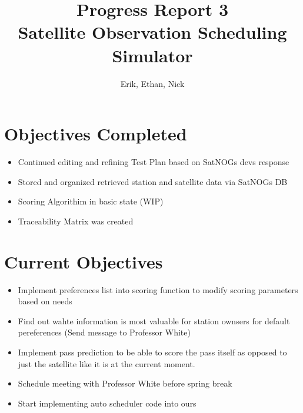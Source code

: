 \documentclass{article}
\title{Progress Report 3\\ Satellite Observation Scheduling Simulator}
\author{Erik, Ethan, Nick}
\begin{document}
\maketitle

\section{Objectives Completed}

\begin{itemize}
	\item Continued editing and refining Test Plan based on SatNOGs devs response
	\item Stored and organized retrieved station and satellite data via SatNOGs DB
  \item Scoring Algorithim in basic state (WIP)
  \item Traceability Matrix was created
\end{itemize}

\section{Current Objectives}

\begin{itemize}
  \item Implement preferences list into scoring function to modify scoring parameters based on needs
  \item Find out wahte information is most valuable for station ownsers for default pereferences (Send message to Professor White)
  \item Implement pass prediction to be able to score the pass itself as opposed to just the satellite like it is at the current moment.
  \item Schedule meeting with Professor White before spring break
  \item Start implementing auto scheduler code into ours
\end{itemize}
\end{document}
